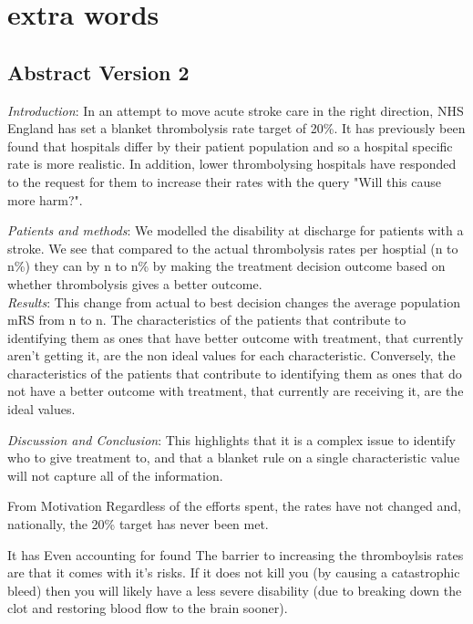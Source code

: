\section{extra words}

\subsection{Abstract Version 2}

\textit{Introduction}: In an attempt to move acute stroke care in the right direction, NHS England has set a blanket thrombolysis rate target of 20\%. It has previously been found that hospitals differ by their patient population and so a hospital specific rate is more realistic. In addition, lower thrombolysing hospitals have responded to the request for them to increase their rates with the query "Will this cause more harm?".\

\textit{Patients and methods}:  We modelled the disability at discharge for patients with a stroke. We see that compared to the actual thrombolysis rates per hosptial (n to n\%) they can by n to n\% by making the treatment decision outcome based on whether thrombolysis gives a better outcome. \\

\textit{Results}: This change from actual to best decision changes the average population mRS from n to n. The characteristics of the patients that contribute to identifying them as ones that have better outcome with treatment, that currently aren't getting it, are the non ideal values for each characteristic. Conversely, the characteristics of the patients that contribute to identifying them as ones that do not have a better outcome with treatment, that currently are receiving it, are the ideal values. 

\textit{Discussion and Conclusion}: This highlights that it is a complex issue to identify who to give treatment to, and that a blanket rule on a single characteristic value will not capture all of the information. 


From Motivation
Regardless of the efforts spent, the rates have not changed and, nationally, the 20\% target has never been met. 

It has Even accounting for  found The barrier to increasing the thromboylsis rates are that it comes with it's risks. If it does not kill you (by causing a catastrophic bleed) then you will likely have a less severe disability (due to breaking down the clot and restoring blood flow to the brain sooner).


